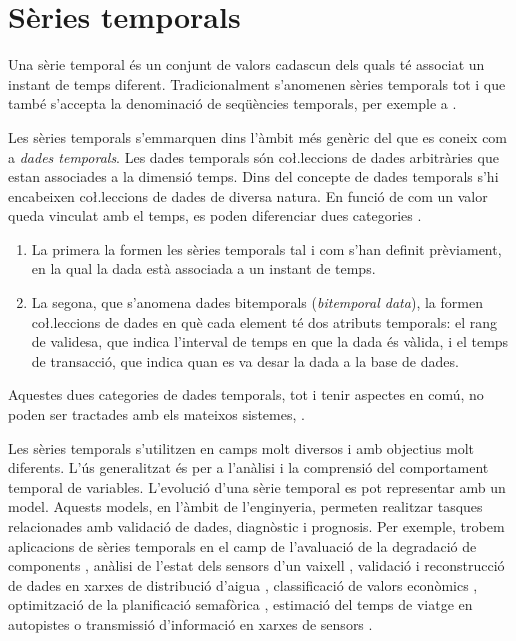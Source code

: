 

\section{Sèries temporals}
\label{sec:art:seriestemporals}



Una sèrie temporal és un conjunt de valors cadascun dels quals té
associat un instant de temps diferent.  Tradicionalment s'anomenen
sèries temporals tot i que també s'accepta la denominació de
seqüències temporals, per exemple a \cite{last:hetland}.

Les sèries temporals s'emmarquen dins l'àmbit més genèric del que es
coneix com a \emph{dades temporals}. Les dades temporals són
co\l.leccions de dades arbitràries que estan associades a la dimensió
temps.  Dins del concepte de dades temporals s'hi encabeixen
co\l.leccions de dades de diversa natura. En funció de com un valor
queda vinculat amb el temps, es poden diferenciar dues
categories \parencite{assfalg08:thesis}.
\begin{enumerate}
\item La primera la formen les sèries temporals tal i com s'han
  definit prèviament, en la qual la dada està associada a un instant
  de temps.
\item La segona, que s'anomena dades bitemporals (\emph{bitemporal
    data}), la formen co\l.leccions de dades en què cada element té
  dos atributs temporals: el rang de validesa, que indica l'interval
  de temps en que la dada és vàlida, i el temps de transacció, que
  indica quan es va desar la dada a la base de dades.
\end{enumerate}
Aquestes dues categories de dades temporals, tot i tenir aspectes en
comú, no poden ser tractades amb els mateixos
sistemes, \parencite{schmidt95}.


Les sèries temporals s'utilitzen en camps molt diversos i amb
objectius molt diferents. L'ús generalitzat és per a l'anàlisi i la
comprensió del comportament temporal de variables. L'evolució d'una
sèrie temporal es pot representar amb un model. Aquests models, en
l'àmbit de l'enginyeria, permeten realitzar tasques relacionades amb
validació de dades, diagnòstic i prognosis.  Per exemple, trobem
aplicacions de sèries temporals en el camp de l'avaluació de la
degradació de components \parencite{yu11}, anàlisi de l'estat dels
sensors d'un vaixell \parencite{palmer07}, validació i reconstrucció
de dades en xarxes de distribució d'aigua \parencite{quevedo10},
classificació de valors econòmics \parencite{dreyer95}, optimització
de la planificació semafòrica \parencite{last11}, estimació del temps
de viatge en autopistes \parencite{soriguera10} o transmissió
d'informació en xarxes de
sensors \parencite{jainagrawal05,yaogehrke02}.


